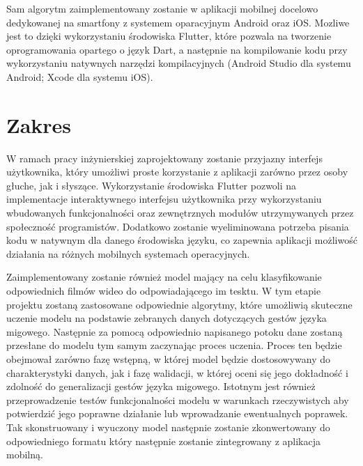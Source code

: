 Sam algorytm zaimplementowany zostanie w aplikacji mobilnej docelowo dedykowanej na smartfony z systemem oparacyjnym Android oraz iOS. Mozliwe jest to dzięki wykorzystaniu środowiska Flutter, które pozwala na tworzenie oprogramowania opartego o język Dart, a następnie na kompilowanie kodu przy wykorzystaniu natywnych narzędzi kompilacyjnych (Android Studio dla systemu Android; Xcode dla systemu iOS).

\section{Zakres}\label{sec:scope}

W ramach pracy inżynierskiej zaprojektowany zostanie przyjazny interfejs użytkownika, który umożliwi proste korzystanie z aplikacji zarówno przez osoby głuche, jak i słyszące.
Wykorzystanie środowiska Flutter pozwoli na implementacje interaktywnego interfejsu użytkownika przy wykorzystaniu wbudowanych funkcjonalności oraz zewnętrznych modułów utrzymywanych przez społeczność programistów.
Dodatkowo zostanie wyeliminowana potrzeba pisania kodu w natywnym dla danego środowiska języku, co zapewnia aplikacji możliwość działania na różnych mobilnych systemach operacyjnych.

Zaimplementowany zostanie również model mający na celu klasyfikowanie odpowiednich filmów wideo do odpowiadającego im tesktu.
W tym etapie projektu zostaną zastosowane odpowiednie algorytmy, które umożliwią skuteczne uczenie modelu na podstawie zebranych danych dotyczących gestów języka migowego.
Następnie za pomocą odpowiednio napisanego potoku dane zostaną przesłane do modelu tym samym zaczynając proces uczenia.
Proces ten będzie obejmował zarówno fazę wstępną, w której model będzie dostosowywany do charakterystyki danych, jak i fazę walidacji, w której oceni się jego dokładność i zdolność do generalizacji gestów języka migowego.
Istotnym jest również przeprowadzenie testów funkcjonalności modelu w warunkach rzeczywistych aby potwierdzić jego poprawne działanie lub wprowadzanie ewentualnych poprawek.  
Tak skonstruowany i wyuczony model następnie zostanie zkonwertowany do odpowiedniego formatu który następnie zostanie zintegrowany z aplikacja mobilną.